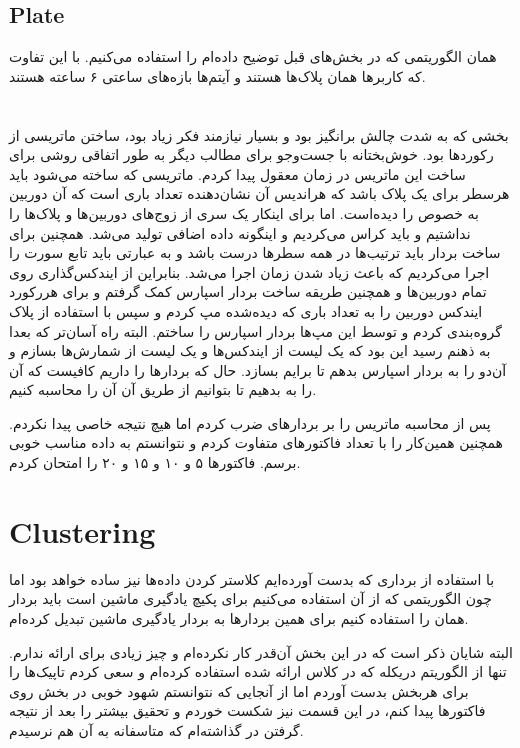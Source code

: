 \documentclass[12pt]{article}
\begin{document}
\subsection*{Plate}
همان الگوریتمی که در بخش‌های قبل توضیح داده‌ام را استفاده می‌کنیم. با این
تفاوت که کاربر‌ها همان پلاک‌ها هستند و آیتم‌ها بازه‌های ساعتی ۶ ساعته هستند.

\section*{}
بخشی که به شدت چالش برانگیز بود و بسیار نیازمند فکر زیاد بود، ساختن ماتریسی 
از رکورد‌ها بود. خوش‌بختانه با جست‌و‌جو برای مطالب دیگر به طور اتفاقی روشی برای ساخت این ماتریس در زمان معقول پیدا کردم.
ماتریسی که ساخته می‌شود باید هرسطر برای یک پلاک باشد که هراندیس آن نشان‌دهنده تعداد باری است که آن دوربین به خصوص را دیده‌است.
اما برای اینکار یک سری از زوج‌های دوربین‌ها و پلاک‌ها را نداشتیم و باید کراس می‌کردیم و اینگونه
داده اضافی تولید می‌شد. همچنین برای ساخت بردار باید ترتیب‌ها در همه
سطر‌ها درست باشد و به عبارتی باید تابع سورت را اجرا می‌کردیم که باعث زیاد شدن زمان اجرا می‌شد.
بنابراین از ایندکس‌گذاری روی تمام دوربین‌ها و همچنین طریقه ساخت بردار اسپارس کمک گرفتم و
برای هررکورد ایندکس دوربین را به تعداد باری که دیده‌شده مپ کردم و سپس با استفاده از پلاک گروه‌بندی کردم و 
توسط این مپ‌ها بردار اسپارس را ساختم. البته راه آسان‌تر که بعدا به ذهنم رسید این بود که یک لیست از ایندکس‌ها و یک لیست از شمارش‌ها بسازم و آن‌دو را به بردار
اسپارس بدهم تا برایم بسازد.
حال که بردار‌ها را داریم کافیست که آن را به 
بدهیم تا بتوانیم از طریق آن 
آن را محاسبه کنیم.

پس از محاسبه ماتریس را بر بردار‌های 
ضرب کردم اما هیچ نتیجه خاصی پیدا نکردم. همچنین همین‌کار را با تعداد فاکتور‌های متفاوت کردم و نتوانستم به داده مناسب خوبی برسم. فاکتور‌ها ۵ و ۱۰ و ۱۵ و ۲۰ را امتحان کردم.

\section*{Clustering}
با استفاده از برداری که بدست آورده‌ایم کلاستر کردن داده‌ها نیز ساده خواهد بود اما چون الگوریتمی که از آن استفاده می‌کنیم برای 
پکیچ یادگیری ماشین است باید بردار همان را استفاده کنیم برای همین بردار‌ها به بردار یادگیری ماشین تبدیل کرده‌ام.

البته شایان ذکر است که در این بخش آن‌قدر کار نکرده‌ام و چیز زیادی برای ارائه ندارم. تنها از الگوریتم دریکله که در کلاس ارائه شده استفاده کرده‌ام و سعی کردم تاپیک‌ها را برای هربخش بدست آوردم
اما از آنجایی که نتوانستم شهود خوبی در بخش 
روی فاکتور‌ها پیدا کنم، در این قسمت نیز شکست خوردم و تحقیق بیشتر را بعد از 
نتیجه گرفتن در 
گذاشته‌ام که متاسفانه به آن هم نرسیدم.
\end{document}
